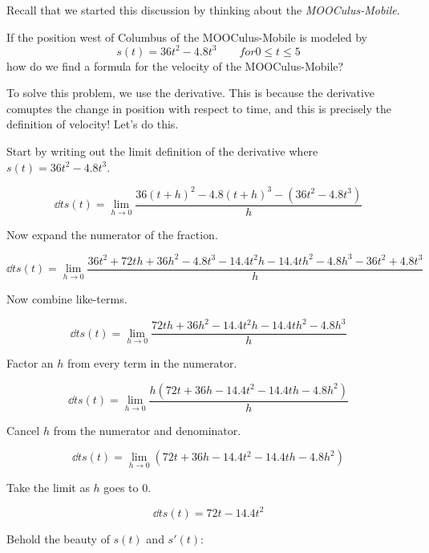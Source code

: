 \documentclass{ximera}
\begin{document}
Recall that we started this discussion by thinking about the
\textit{MOOCulus-Mobile}.

\begin{example}
  If the position west of Columbus of the MOOCulus-Mobile is modeled by 
  \[
  s(t) = 36t^2 - 4.8t^3 \qquad \text{$for 0\le t\le 5$}
  \] 
  how do we find a formula for the velocity of the MOOCulus-Mobile?

  To solve this problem, we use the derivative. This is because the
  derivative comuptes the change in position with respect to time, and
  this is precisely the definition of velocity! Let's do this.

  Start by writing out the limit definition of the derivative where
  $s(t) = 36t^2 - 4.8t^3$.
  \begin{freeResponse}[given]
    \[
    \dd t s(t) = \lim_{h\to 0}\frac{36(t+h)^2 - 4.8(t+h)^3 - \left(36t^2 - 4.8t^3\right)}{h}
    \]
  \end{freeResponse}
  Now expand the numerator of the fraction.
  \begin{freeResponse}[given]
    \[
    \dd t s(t) = \lim_{h\to 0}\frac{36t^2 + 72th + 36h^2 - 4.8t^3 - 14.4t^2h - 14.4th^2 - 4.8h^3 - 36t^2 + 4.8t^3}{h}
    \]
  \end{freeResponse}
  Now combine like-terms.
  \begin{freeResponse}[given]
    \[
    \dd t s(t) = \lim_{h\to 0}\frac{72th + 36h^2 - 14.4t^2h - 14.4th^2 - 4.8h^3}{h}
    \]
  \end{freeResponse}
  Factor an $h$ from every term in the numerator.
  \begin{freeResponse}[given]
    \[
    \dd t s(t) = \lim_{h\to 0}\frac{h\left(72t + 36h - 14.4t^2 - 14.4th - 4.8h^2\right)}{h}
    \]
  \end{freeResponse}
  Cancel $h$ from the numerator and denominator.
  \begin{freeResponse}[given]
    \[
    \dd t s(t) = \lim_{h\to 0}\left(72t + 36h - 14.4t^2 - 14.4th - 4.8h^2\right)
    \]
  \end{freeResponse}
  Take the limit as $h$ goes to $0$. 
  \begin{freeResponse}[given]
    \[
    \dd t s(t) = 72t-14.4t^2
    \]
  \end{freeResponse}
  Behold the beauty of $s(t)$ and $s'(t)$:
  \begin{image}
\end{image}
\end{example}
\end{document}
